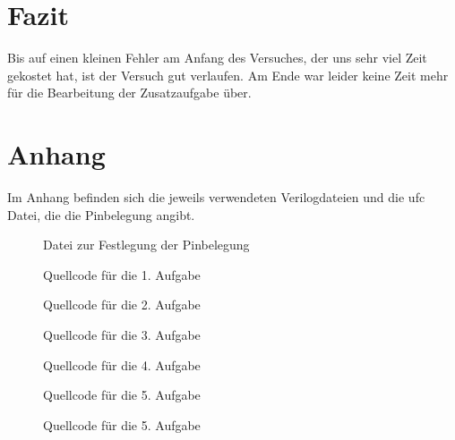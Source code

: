 \documentclass[12pt,a4paper]{article}
\begin{document}
\section{Fazit}
Bis auf einen kleinen Fehler am Anfang des Versuches, der uns sehr viel Zeit gekostet hat, ist der Versuch gut verlaufen. Am Ende war leider keine Zeit mehr für die Bearbeitung der Zusatzaufgabe über.

\section{Anhang}

Im Anhang befinden sich die jeweils verwendeten Verilogdateien und die ufc Datei, die die Pinbelegung angibt.

\begin{figure}[H]

\caption*{Datei zur Festlegung der Pinbelegung}
\label{scr:1}
\end{figure}

\begin{figure}[H]

\caption*{Quellcode für die 1. Aufgabe}
\label{scr:1}
\end{figure}


\newpage

\begin{figure}[H]

\caption*{Quellcode für die 2. Aufgabe}
\label{scr:2}
\end{figure}


\newpage

\begin{figure}[H]

\caption*{Quellcode für die 3. Aufgabe}
\label{scr:3}
\end{figure}


\newpage

\begin{figure}[H]

\caption*{Quellcode für die 4. Aufgabe}
\label{scr:4}
\end{figure}


\newpage

\begin{figure}[H]

\caption*{Quellcode für die 5. Aufgabe}
\label{scr:5}
\end{figure}

\newpage

\begin{figure}[H]

\caption*{Quellcode für die 5. Aufgabe}
\label{scr:6}
\end{figure}
\end{document}
